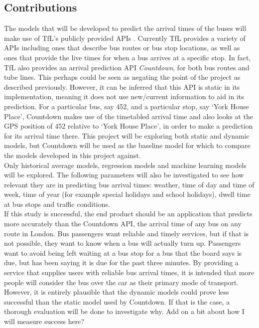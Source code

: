 \subsection{Contributions}

The models that will be developed to predict the arrival times of the buses will make use of TfL's publicly provided APIs \cite{tfl-api}. Currently TfL provides a variety of APIs including ones that describe bus routes or bus stop locations, as well as ones that provide the live times for when a bus arrives at a specific stop. In fact, TfL also provides an arrival prediction API \textit{Countdown}, for both bus routes and tube lines. This perhaps could be seen as negating the point of the project as described previously. However, it can be inferred that this API is static in its implementation, meaning it does not use new/current information to aid in its prediction. For a particular bus, say 452, and a particular stop, say `York House Place', Countdown makes use of the timetabled arrival time and also looks at the GPS position of 452 relative to `York House Place', in order to make a prediction for its arrival time there. This project will be exploring both static and dynamic models, but Countdown will be used as the baseline model for which to compare the models developed in this project against. \\

Only historical average models, regression models and machine learning models will be explored. The following parameters will also be investigated to see how relevant they are in predicting bus arrival times: weather, time of day and time of week, time of year (for example special holidays and school holidays), dwell time at bus stops and traffic conditions. \\

If this study is successful, the end product should be an application that predicts more accurately than the Countdown API, the arrival time of any bus on any route in London. Bus passengers want reliable and timely services, but if that is not possible, they want to know when a bus will actually turn up. Passengers want to avoid being left waiting at a bus stop for a bus that the board says is due, but has been saying it is due for the past three minutes. By providing a service that supplies users with reliable bus arrival times, it is intended that more people will consider the bus over the car as their primary mode of transport. However, it is entirely plausible that the dynamic models could prove less successful than the static model used by Countdown. If that is the case, a thorough evaluation will be done to investigate why. Add on a bit about how I will measure success here?

\clearpage


